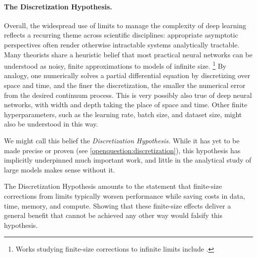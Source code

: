 \paragraph{The Discretization Hypothesis.}
Overall, the widespread use of limits to manage the complexity of deep learning reflects a recurring theme across scientific disciplines: appropriate asymptotic perspectives often render otherwise intractable systems analytically tractable.
Many theorists share a heuristic belief that most practical neural networks can be understood as noisy, finite approximations to models of infinite size.%
\footnote{Works studying finite-size corrections to infinite limits include \citep{hanin2019finite,roberts2022principles, zavatone2021asymptotics, segadlo2022unified,bordelon2023dynamics, glasgow2025propagation}.}
By analogy, one numerically solves a partial differential equation by discretizing over space and time, and the finer the discretization, the smaller the numerical error from the desired continuum process.
This is very possibly also true of deep neural networks, with width and depth taking the place of space and time.
Other finite hyperparameters, such as the learning rate, batch size, and dataset size, might also be understood in this way.

We might call this belief the \textit{Discretization Hypothesis.}
While it has yet to be made precise or proven (see \cref{openquestion:discretization}), this hypothesis has implicitly underpinned much important work, and little in the analytical study of large models makes sense without it.

The Discretization Hypothesis amounts to the statement that finite-size corrections from limits typically worsen performance while saving costs in data, time, memory, and compute.
Showing that these finite-size effects deliver a general benefit that cannot be achieved any other way would falsify this hypothesis.
